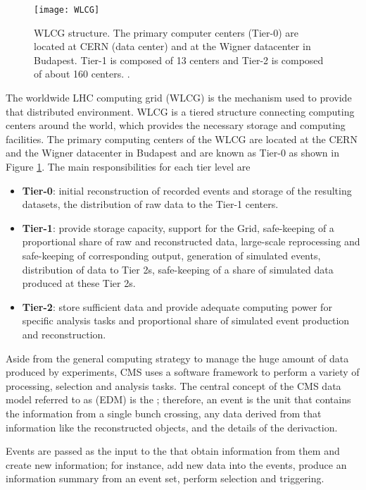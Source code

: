 \begin{figure}[h!]
  \centering
  \texttt{[image: WLCG]}
  \caption[WLCG structure]{WLCG structure. The primary computer centers (Tier-0) are located at CERN (data center) and at the Wigner datacenter in Budapest. Tier-1 is composed of 13 centers and Tier-2 is composed of about 160 centers. \cite{wlcg}. }
  \label{fig:wlcg}
\end{figure}

The worldwide LHC computing grid (WLCG) is the mechanism used to provide that distributed environment. WLCG is a tiered structure connecting computing centers around the world, which provides the necessary storage and computing facilities. The primary computing centers of the WLCG are located at the CERN and the Wigner datacenter in Budapest and are known as Tier-0 as shown in Figure \ref{fig:wlcg}. The main responsibilities for each tier level are \cite{wlcg}

\begin{itemize}
\item \textbf{Tier-0}: initial reconstruction of recorded events and storage of the resulting datasets, the distribution of raw data to the Tier-1 centers.
\item \textbf{Tier-1}: provide storage capacity, support for the Grid, safe-keeping of a proportional share of raw and reconstructed data, large-scale reprocessing and safe-keeping of corresponding output, generation of simulated events, distribution of data to Tier 2s, safe-keeping of a share of simulated data produced at these Tier 2s.
\item \textbf{Tier-2}: store sufficient data and provide adequate computing power for specific analysis tasks and proportional share of simulated event production and reconstruction.
\end{itemize}

Aside from the general computing strategy to manage the huge amount of data produced by experiments, CMS uses a software framework to perform a variety of processing, selection and analysis tasks. The central concept of the CMS data model referred to as  (EDM) is the ; therefore, an event is the unit that contains the information from a single bunch crossing, any data derived from that information like the reconstructed objects, and the details of the derivaction.

Events are passed as the input to the  that obtain information from them and create new information; for instance,  add new data into the events,  produce an information summary from an event set,  perform selection and triggering.

